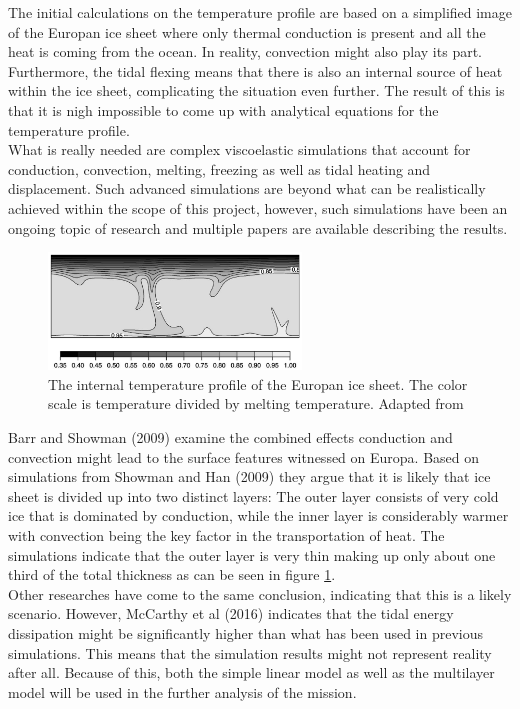 The initial calculations on the temperature profile are based on a simplified image of the Europan ice sheet where only thermal conduction is present and all the heat is coming from the ocean. In reality, convection might also play its part. Furthermore, the tidal flexing means that there is also an internal source of heat within the ice sheet, complicating the situation even further. The result of this is that it is nigh impossible to come up with analytical equations for the temperature profile.\\

\noindent
What is really needed are complex viscoelastic simulations that account for conduction, convection, melting, freezing as well as tidal heating and displacement. Such advanced simulations are beyond what can be realistically achieved within the scope of this project, however, such simulations have been an ongoing topic of research and multiple papers are available describing the results.\\

\begin{figure}[ht]
	\centering
	\includegraphics[width = 0.6\textwidth]{figures/LAMC/2layer}
	\caption{The internal temperature profile of the Europan ice sheet. The color scale is temperature divided by melting temperature. Adapted from \cite{article:barr2014a}}
	\label{fig:2layer}
\end{figure}

\noindent 
Barr and Showman (2009)\cite{article:barr2014a} examine the combined effects conduction and convection might lead to the surface features witnessed on Europa. Based on simulations from Showman and Han (2009)\cite{article:showman2005a} they argue that it is likely that ice sheet is divided up into two distinct layers: The outer layer consists of very cold ice that is dominated by conduction, while the inner layer is considerably warmer with convection being the key factor in the transportation of heat. The simulations indicate that the outer layer is very thin making up only about one third of the total thickness as can be seen in figure \ref{fig:2layer}. \\

\noindent
Other researches have come to the same conclusion, indicating that this is a likely scenario\cite{article:mckinnon1999a}\cite{article:tobie2003a}. However, McCarthy et al (2016)\cite{article:mccarthy2016a} indicates that the tidal energy dissipation might be significantly higher than what has been used in previous simulations. This means that the simulation results might not represent reality after all. Because of this, both the simple linear model as well as the multilayer model will be used in the further analysis of the mission.